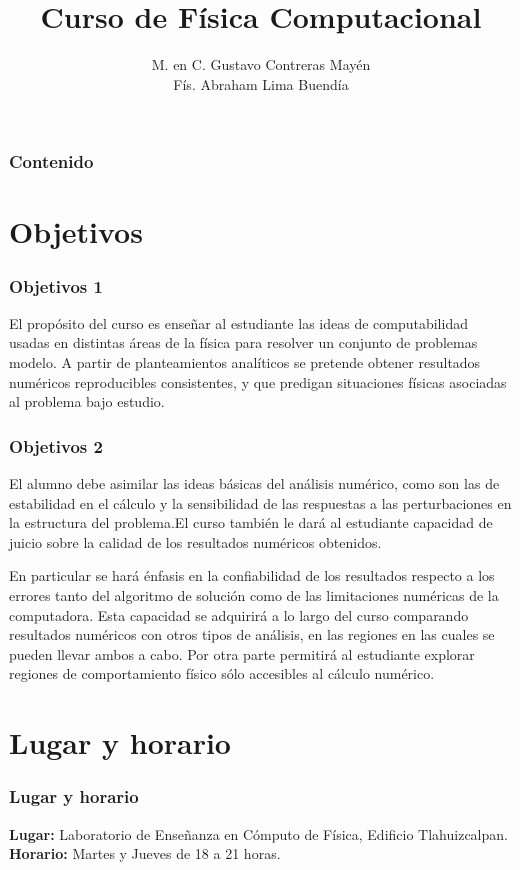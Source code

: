 \documentclass[12pt]{beamer}
\title{Curso de Física Computacional}
\author[]{M. en C. Gustavo Contreras Mayén \\ Fís. Abraham Lima Buendía}
\date{ }
\begin{document}
\maketitle
\fontsize{14}{14}\selectfont
{}
\begin{frame}
\frametitle{Contenido}
\tableofcontents[pausesections]
\end{frame}
\section{Objetivos}
\begin{frame}
\frametitle{Objetivos 1}
El propósito del curso es enseñar al estudiante las ideas de computabilidad usadas en distintas áreas de la  física para resolver un conjunto de problemas modelo. A partir de planteamientos analíticos se pretende obtener resultados numéricos reproducibles consistentes, y que predigan situaciones físicas asociadas al problema bajo estudio.
\end{frame}
\begin{frame}
\frametitle{Objetivos 2}
El alumno debe asimilar las ideas básicas del análisis numérico, como son las de estabilidad en el cálculo y la sensibilidad de las respuestas a las perturbaciones en la estructura del problema.El curso también le dará al estudiante capacidad de juicio sobre la calidad de los resultados numéricos obtenidos.
\end{frame}
\begin{frame}
En particular se hará énfasis en la confiabilidad de los resultados respecto a los errores tanto del algoritmo de solución como de las limitaciones numéricas de la computadora. Esta capacidad se adquirirá a lo largo del curso comparando resultados numéricos con otros tipos de análisis, en las regiones en las cuales se pueden llevar ambos a cabo. Por otra parte permitirá al estudiante explorar regiones de comportamiento físico sólo accesibles al cálculo numérico.
\end{frame}
\section{Lugar y horario}
\begin{frame}
\frametitle{Lugar y horario} 
\textbf{Lugar: }Laboratorio de Enseñanza en Cómputo de Física, Edificio Tlahuizcalpan.
\\
\bigskip
\textbf{Horario: } Martes y Jueves de 18 a 21 horas.
\end{frame}
\end{document}
